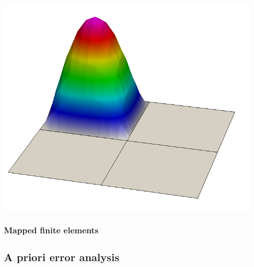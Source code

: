 \documentclass[USEnglish,ignorenonframetext,notheorems,aspectratio=1610]{beamer}
\begin{document}
\begin{frame}
\begin{center}
    \includegraphics[height=.27\textheight]{graph/dgbasis1-22}
  \end{center}
\end{frame}

\subsubsection{Mapped finite elements}

\frame {}
\frame {}
\frame {}
\frame {}
\frame {}
\frame {}
\frame {}
\frame {}

\subsection{A priori error analysis}
\frame{\subtoc}

\frame {}
\frame {}
\frame {}
\frame {}
\frame {
  }
\frame {}
\frame {
  }
\frame {}
\end{document}
